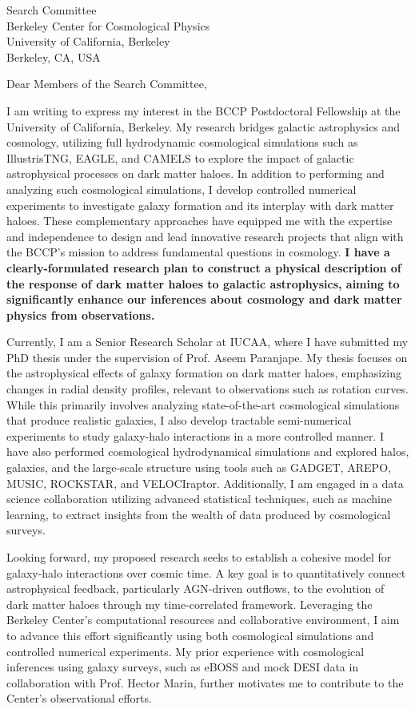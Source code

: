 \documentclass[11pt]{letter}
\begin{document}
\begin{letter}{Search Committee \\ Berkeley Center for Cosmological Physics \\ University of California, Berkeley \\ Berkeley, CA, USA}

\opening{Dear Members of the Search Committee,}

I am writing to express my interest in the BCCP Postdoctoral Fellowship at the University of California, Berkeley. My research bridges galactic astrophysics and cosmology, utilizing full hydrodynamic cosmological simulations such as IllustrisTNG, EAGLE, and CAMELS to explore the impact of galactic astrophysical processes on dark matter haloes. In addition to performing and analyzing such cosmological simulations, I develop controlled numerical experiments to investigate galaxy formation and its interplay with dark matter haloes. These complementary approaches have equipped me with the expertise and independence to design and lead innovative research projects that align with the BCCP's mission to address fundamental questions in cosmology. \textbf{I have a clearly-formulated research plan to construct a physical description of the response of dark matter haloes to galactic astrophysics, aiming to significantly enhance our inferences about cosmology and dark matter physics from observations.}

Currently, I am a Senior Research Scholar at IUCAA, where I have submitted my PhD thesis under the supervision of Prof. Aseem Paranjape. My thesis focuses on the astrophysical effects of galaxy formation on dark matter haloes, emphasizing changes in radial density profiles, relevant to observations such as rotation curves. While this primarily involves analyzing state-of-the-art cosmological simulations that produce realistic galaxies, I also develop tractable semi-numerical experiments to study galaxy-halo interactions in a more controlled manner. I have also performed cosmological hydrodynamical simulations and explored halos, galaxies, and the large-scale structure using tools such as GADGET, AREPO, MUSIC, ROCKSTAR, and VELOCIraptor. Additionally, I am engaged in a data science collaboration utilizing advanced statistical techniques, such as machine learning, to extract insights from the wealth of data produced by cosmological surveys.

Looking forward, my proposed research seeks to establish a cohesive model for galaxy-halo interactions over cosmic time. A key goal is to quantitatively connect astrophysical feedback, particularly AGN-driven outflows, to the evolution of dark matter haloes through my time-correlated framework. Leveraging the Berkeley Center's computational resources and collaborative environment, I aim to advance this effort significantly using both cosmological simulations and controlled numerical experiments. My prior experience with cosmological inferences using galaxy surveys, such as eBOSS and mock DESI data in collaboration with Prof. Hector Marin, further motivates me to contribute to the Center's observational efforts.


\end{letter}
\end{document}
